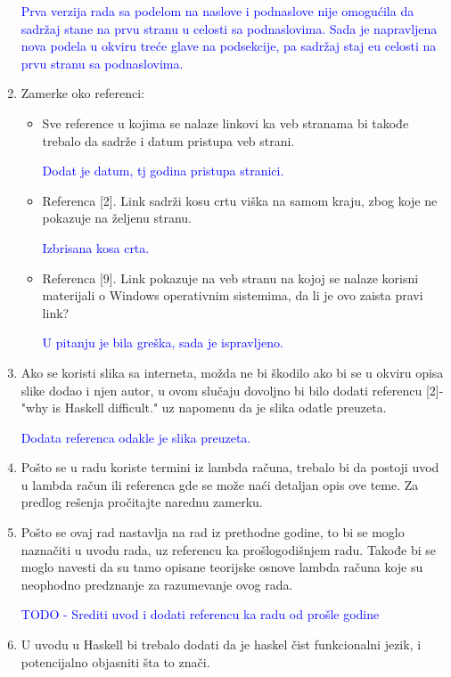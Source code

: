 \documentclass[a4paper]{report}
\newcommand{\odgovor}[1]{\textcolor{blue}{#1}}
\begin{document}
\begin{enumerate}
		\odgovor{Prva verzija rada sa podelom na naslove i podnaslove nije omogućila da sadržaj stane na prvu stranu u celosti sa podnaslovima. Sada je napravljena nova podela u okviru treće glave na podsekcije, pa sadržaj staj eu celosti na prvu stranu sa podnaslovima.}
		
		\item Zamerke oko referenci:
		\begin{itemize}
			\item Sve reference u kojima se nalaze linkovi ka veb stranama bi takođe trebalo da sadrže i datum pristupa veb strani.
			
			\odgovor{Dodat je datum, tj godina pristupa stranici.}
			
			\item Referenca [2]. Link sadrži kosu crtu viška na samom kraju, zbog koje ne pokazuje na željenu stranu.
			
			\odgovor{Izbrisana kosa crta.}
			
			\item Referenca [9]. Link pokazuje na veb stranu na kojoj se nalaze korisni materijali o Windows operativnim sistemima, da li je ovo zaista pravi link?
			
			\odgovor{U pitanju je bila greška, sada je ispravljeno.}
			
		\end{itemize}
		\item Ako se koristi slika sa interneta, možda ne bi škodilo ako bi se u okviru opisa slike dodao i njen autor, u ovom slučaju dovoljno bi bilo dodati referencu [2]-"why is Haskell difficult." uz napomenu da je slika odatle preuzeta.
		
		\odgovor{Dodata referenca odakle je slika preuzeta.}
		
		\item Pošto se u radu koriste termini iz lambda računa, trebalo bi da postoji uvod u lambda račun ili referenca gde se može naći detaljan opis ove teme. Za predlog rešenja pročitajte narednu zamerku.
		
		\item Pošto se ovaj rad nastavlja na rad iz prethodne godine, to bi se moglo naznačiti u uvodu rada, uz referencu ka prošlogodišnjem radu. Takođe bi se moglo navesti da su tamo opisane teorijske osnove lambda računa koje su neophodno predznanje za razumevanje ovog rada.
		
		\odgovor{TODO - Srediti uvod i dodati referencu ka radu od prošle godine}
		
		\item U uvodu u Haskell bi trebalo dodati da je haskel čist funkcionalni jezik, i potencijalno objasniti šta to znači.
		

\end{enumerate}
\end{document}
